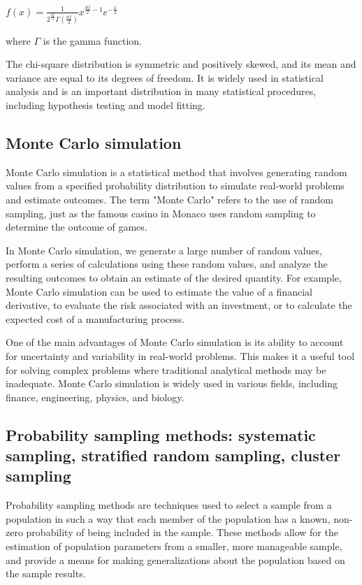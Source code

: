 \documentclass[12pt, a4paper, oneside]{article}
\begin{document}
$f(x) = \frac{1}{2^{\frac{df}{2}} \Gamma(\frac{df}{2})} x^{\frac{df}{2} - 1} e^{-\frac{x}{2}}$

where $\Gamma$ is the gamma function.

The chi-square distribution is symmetric and positively skewed, and its mean and variance are equal to its degrees of freedom. It is widely used in statistical analysis and is an important distribution in many statistical procedures, including hypothesis testing and model fitting.
\subsection{ Monte Carlo simulation }
Monte Carlo simulation is a statistical method that involves generating random values from a specified probability distribution to simulate real-world problems and estimate outcomes. The term "Monte Carlo" refers to the use of random sampling, just as the famous casino in Monaco uses random sampling to determine the outcome of games.

In Monte Carlo simulation, we generate a large number of random values, perform a series of calculations using these random values, and analyze the resulting outcomes to obtain an estimate of the desired quantity. For example, Monte Carlo simulation can be used to estimate the value of a financial derivative, to evaluate the risk associated with an investment, or to calculate the expected cost of a manufacturing process.

One of the main advantages of Monte Carlo simulation is its ability to account for uncertainty and variability in real-world problems. This makes it a useful tool for solving complex problems where traditional analytical methods may be inadequate. Monte Carlo simulation is widely used in various fields, including finance, engineering, physics, and biology.
\subsection{ Probability sampling methods: systematic sampling, stratified random sampling, cluster sampling }
Probability sampling methods are techniques used to select a sample from a population in such a way that each member of the population has a known, non-zero probability of being included in the sample. These methods allow for the estimation of population parameters from a smaller, more manageable sample, and provide a means for making generalizations about the population based on the sample results.
\end{document}
